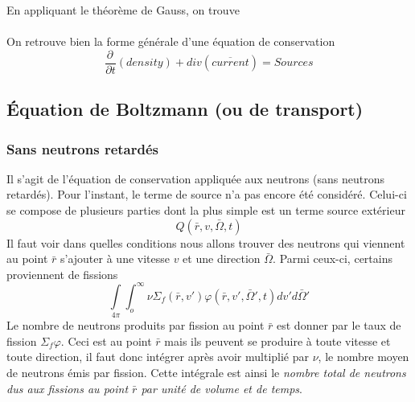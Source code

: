 En appliquant le théorème de Gauss, on trouve\\

\ \\

On retrouve bien la forme générale d'une équation de conservation
\begin{equation}
\frac{{\partial \,}}{{\partial t}}\left( {density} \right) + div(\overline {current} ) = Sources
\end{equation}


\subsection{Équation de Boltzmann (ou de transport)}
\subsubsection{Sans neutrons retardés}
Il s'agit de l'équation de conservation appliquée aux neutrons (sans neutrons retardés). Pour 
l'instant, le terme de source n'a pas encore été considéré. Celui-ci se compose de plusieurs 
parties dont la plus simple est un terme source extérieur 
\begin{equation}
Q(\bar r,v,\bar \Omega ,t)
\end{equation}
Il faut voir dans quelles conditions nous allons trouver des neutrons qui viennent au point $\bar r$ 
s'ajouter à une vitesse $v$ et une direction $\bar\Omega$.  Parmi ceux-ci, certains proviennent de 
fissions
\begin{equation}
\int\limits_{4\pi }    \int_o^\infty     \nu {\Sigma _f}(\bar r,v')\varphi (\bar r,v',\bar \Omega ',t)dv'd\bar \Omega '
\end{equation}
Le nombre de neutrons produits par fission au point $\bar r$ est donner par le taux de fission 
$\Sigma_f\varphi$. Ceci est au point $\bar r$ mais ils peuvent se produire à toute vitesse et toute 
direction, il faut donc intégrer après avoir multiplié par $\nu$, le nombre moyen de neutrons émis 
par fission.  Cette intégrale est ainsi le \textit{nombre total de neutrons dus aux fissions au 
point $\bar r$ par unité de volume et de temps}.\\

